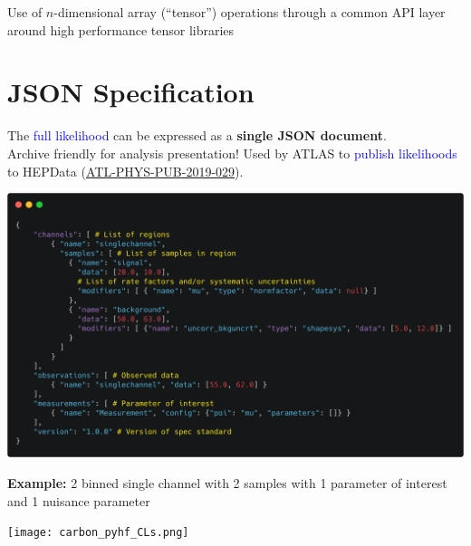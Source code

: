 \documentclass[princeton,portrait]{a0poster}
\begin{document}
\begin{multicols}{2}
 \noindent Use of $n$-dimensional array (``tensor'') operations through a common API layer around high performance tensor libraries


 \section*{\LARGE\color{MediumBlue} JSON Specification}
 The \textcolor{blue}{full likelihood} can be expressed as a \textbf{single JSON document}.\\Archive friendly for analysis presentation! Used by ATLAS to \textcolor{blue}{publish likelihoods} to HEPData (\textcolor{blue}{\href{https://atlas.web.cern.ch/Atlas/GROUPS/PHYSICS/PUBNOTES/ATL-PHYS-PUB-2019-029/}{ATL-PHYS-PUB-2019-029}}).
 \vspace{0.5em}
 \begin{center}
  \href{https://raw.githubusercontent.com/scikit-hep/pyhf/master/docs/examples/json/2-bin_1-channel.json}{\includegraphics[width=0.65\linewidth]{carbon_JSON_spec_annotated.png}}
 \end{center}
 \vspace{-1em}
 \begin{center}
  {\small\textbf{Example:} 2 binned single channel with 2 samples with 1 parameter of interest and 1 nuisance parameter}
 \end{center}
 \begin{center}
  \texttt{[image: carbon\_pyhf\_CLs.png]}
 \end{center}
\end{multicols}
\end{document}
